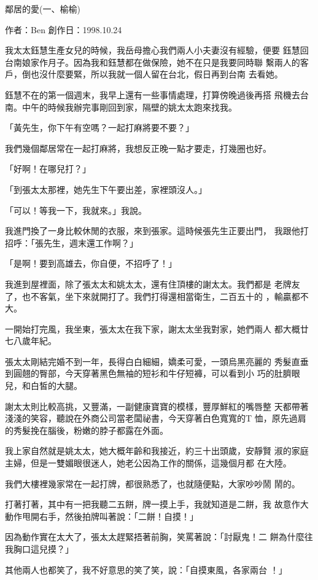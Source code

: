 鄰居的愛(一、榆榆)

作者：Ben
創作日：1998.10.24

我太太鈺慧生產女兒的時候，我岳母擔心我們兩人小夫妻沒有經驗，便要
鈺慧回台南娘家作月子。因為我和鈺慧都在做保險，她不在只是我要同時聯
繫兩人的客戶，倒也沒什麼要緊，所以我就一個人留在台北，假日再到台南
去看她。

鈺慧不在的第一個週末，我早上還有一些事情處理，打算傍晚過後再搭
飛機去台南。中午的時候我辦完事剛回到家，隔壁的姚太太跑來找我。

「黃先生，你下午有空嗎？一起打麻將要不要？」

我們幾個鄰居常在一起打麻將，我想反正晚一點才要走，打幾圈也好。

「好啊！在哪兒打？」

「到張太太那裡，她先生下午要出差，家裡頭沒人。」

「可以！等我一下，我就來。」我說。

我進門換了一身比較休閒的衣服，來到張家。這時候張先生正要出門，
我跟他打招呼：「張先生，週末還工作啊？」

「是啊！要到高雄去，你自便，不招呼了！」

我進到屋裡面，除了張太太和姚太太，還有住頂樓的謝太太。我們都是
老牌友了，也不客氣，坐下來就開打了。我們打得還相當衛生，二百五十的
，輸贏都不大。

一開始打完風，我坐東，張太太在我下家，謝太太坐我對家，她們兩人
都大概廿七八歲年紀。

張太太剛結完婚不到一年，長得白白細細，嬌柔可愛，一頭烏黑亮麗的
秀髮直垂到圓翹的臀部，今天穿著黑色無袖的短衫和牛仔短褲，可以看到小
巧的肚臍眼兒，和白皙的大腿。

謝太太則比較高挑，又豐滿，一副健康寶寶的模樣，豐厚鮮紅的嘴唇整
天都帶著淺淺的笑容，聽說在外商公司當老闆祕書，今天穿著白色寬寬的T
恤，原先過肩的秀髮挽在腦後，粉嫩的脖子都露在外面。

我上家自然就是姚太太，她大概年齡和我接近，約三十出頭歲，安靜賢
淑的家庭主婦，但是一雙媚眼很迷人，她老公因為工作的關係，這幾個月都
在大陸。

我們大樓裡幾家常在一起打牌，都很熟悉了，也就隨便點，大家吵吵鬧
鬧的。

打著打著，其中有一把我聽二五餅，牌一摸上手，我就知道是二餅，我
故意作大動作甩開右手，然後拍牌叫著說：「二餅！自摸！」

因為動作實在太大了，張太太趕緊捂著前胸，笑罵著說：「討厭鬼！二
餅為什麼往我胸口這兒摸？」

其他兩人也都笑了，我不好意思的笑了笑，說：「自摸東風，各家兩台
！」


